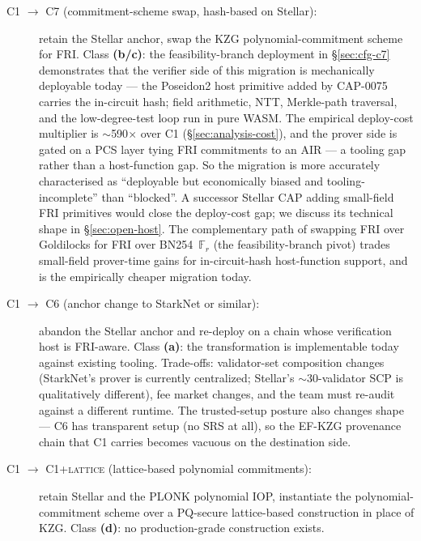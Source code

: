 \begin{description}
  \item[\textsc{C1 $\to$ C7} (commitment-scheme swap, hash-based on
    Stellar):] retain the Stellar anchor, swap the KZG
    polynomial-commitment scheme for FRI. Class \textbf{(b/c)}: the
    feasibility-branch deployment in \S\ref{sec:cfg-c7} demonstrates
    that the verifier side of this migration is mechanically
    deployable today --- the Poseidon2 host primitive added by
    CAP-0075~\cite{stellar-cap-0075} carries the in-circuit hash;
    field arithmetic, NTT, Merkle-path traversal, and the
    low-degree-test loop run in pure WASM. The empirical deploy-cost
    multiplier is $\sim$590$\times$ over C1
    (\S\ref{sec:analysis-cost}), and the prover side is gated on a
    PCS layer tying FRI commitments to an AIR --- a tooling gap
    rather than a host-function gap. So the migration is more
    accurately characterised as ``deployable but economically
    biased and tooling-incomplete'' than ``blocked''. A successor
    Stellar CAP adding small-field FRI primitives would close the
    deploy-cost gap; we discuss its technical shape in
    \S\ref{sec:open-host}. The complementary path of swapping FRI
    over Goldilocks for FRI over BN254~$\mathbb{F}_r$ (the
    feasibility-branch pivot) trades small-field prover-time gains
    for in-circuit-hash host-function support, and is the empirically
    cheaper migration today.
  \item[\textsc{C1 $\to$ C6} (anchor change to StarkNet or similar):]
    abandon the Stellar anchor and re-deploy on a chain whose
    verification host is FRI-aware. Class \textbf{(a)}: the
    transformation is implementable today against existing tooling.
    Trade-offs: validator-set composition changes (StarkNet's prover
    is currently centralized; Stellar's $\sim$30-validator SCP is
    qualitatively different), fee market changes, and the team must
    re-audit against a different runtime. The trusted-setup
    posture also changes shape --- C6 has transparent setup
    (no SRS at all), so the EF-KZG provenance chain that C1 carries
    becomes vacuous on the destination side.
  \item[\textsc{C1 $\to$ C1+lattice} (lattice-based polynomial
    commitments):] retain Stellar and the PLONK polynomial IOP,
    instantiate the polynomial-commitment scheme over a PQ-secure
    lattice-based construction in place of KZG. Class \textbf{(d)}:
    no production-grade construction exists.
\end{description}

